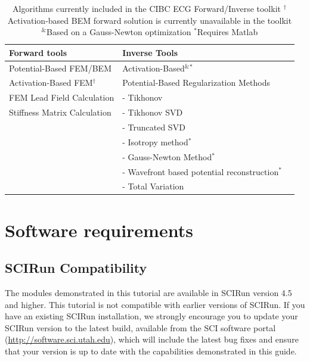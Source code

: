 \documentclass[fleqn,11pt,openany]{book}
\begin{document}
\begin{table}[htb]
\begin{tabular}{|ll|l|}
\hline
{\bf Forward tools} & {\bf Inverse Tools}\\ \hline
\hline
Potential-Based FEM/BEM & Activation-Based$^{\&}$$^{*}$\\ \hline
Activation-Based FEM$^{\dag}$ & Potential-Based Regularization  Methods\\ \hline
FEM Lead Field Calculation &   -  Tikhonov  \\ \hline
Stiffness Matrix Calculation &- Tikhonov SVD  \\ \hline
 & - Truncated SVD\\ \hline
 & - Isotropy method$^{*}$\\ \hline
 & - Gauss-Newton Method$^{*}$\\ \hline
 & - Wavefront based potential reconstruction$^*$\\ \hline
 & - Total Variation \\ \hline
\end{tabular}
\caption{Algorithms currently included in the CIBC ECG Forward/Inverse
toolkit \newline
$^\dag$Activation-based BEM forward solution is currently
unavailable in the toolkit \newline
$^{\&}$Based on a Gauss-Newton optimization \newline
$^{*}$Requires Matlab
}
\label{tab:prop}
\end{table}

\newpage

\section{Software requirements}

\subsection{SCIRun Compatibility}

The modules demonstrated in this tutorial are available in SCIRun
version 4.5 and higher. This tutorial is not compatible with earlier
 versions of SCIRun. If you have an existing SCIRun installation, we
 strongly encourage you to update your SCIRun version
to the latest build, available from the SCI software portal
(\href{http://software.sci.utah.edu}{http://software.sci.utah.edu}), which will include the latest bug
fixes and ensure that your version is up to date with the capabilities demonstrated in this guide.
\end{document}
